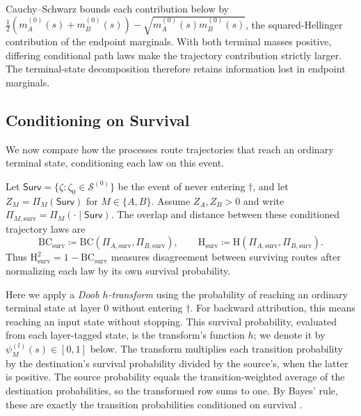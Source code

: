 Cauchy--Schwarz bounds each contribution below by
$\tfrac12(m_A^{(0)}(s)+m_B^{(0)}(s))-\sqrt{m_A^{(0)}(s)m_B^{(0)}(s)}$,
the squared-Hellinger contribution of the endpoint marginals. With both terminal masses positive, differing conditional path laws make the trajectory contribution strictly larger. The terminal-state decomposition therefore retains information lost in endpoint marginals.

\subsection{Conditioning on Survival}\label{ptnb:sec:lmp-conditioned-survival}

We now compare how the processes route trajectories that reach an ordinary terminal state, conditioning each law on this event.

\begin{definition}\label{def:survival_conditioned_distances}
Let $\mathsf{Surv}=\{\zeta:\zeta_0\in\mathcal S^{(0)}\}$ be the event of never entering $\dagger$, and let $Z_M=\Pi_M(\mathsf{Surv})$ for $M\in\{A,B\}$. Assume $Z_A,Z_B>0$ and write $\Pi_{M,\mathrm{surv}}=\Pi_M(\cdot\mid\mathsf{Surv})$. The overlap and distance between these conditioned trajectory laws are
\[
\mathrm{BC}_{\mathrm{surv}}\coloneqq\mathrm{BC}(\Pi_{A,\mathrm{surv}},\Pi_{B,\mathrm{surv}}),
\qquad
\mathrm H_{\mathrm{surv}}\coloneqq\mathrm H(\Pi_{A,\mathrm{surv}},\Pi_{B,\mathrm{surv}}).
\]
Thus $\mathrm H_{\mathrm{surv}}^2=1-\mathrm{BC}_{\mathrm{surv}}$ measures disagreement between surviving routes after normalizing each law by its own survival probability.
\end{definition}

Here we apply a \emph{Doob $h$-transform} using the probability of reaching an ordinary terminal state at layer $0$ without entering $\dagger$. For backward attribution, this means reaching an input state without stopping. This survival probability, evaluated from each layer-tagged state, is the transform's function $h$; we denote it by $\psi_M^{(l)}(s)\in[0,1]$ below. The transform multiplies each transition probability by the destination's survival probability divided by the source's, when the latter is positive. The source probability equals the transition-weighted average of the destination probabilities, so the transformed row sums to one. By Bayes' rule, these are exactly the transition probabilities conditioned on survival \parencite[Section~17.6.1]{LevinPeres2017MarkovChains}.

